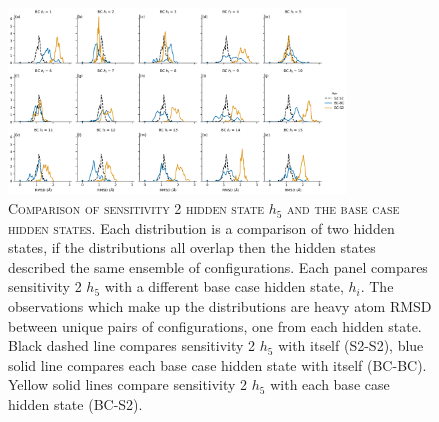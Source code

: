 \begin{figure}[h!]
 \centering
 \caption[Comparison of sensitivity 2 hidden state 5 with the base case hidden states]{\textsc{Comparison of sensitivity 2 hidden state $h_{5}$ and the base case hidden states}. Each distribution is a comparison of two hidden states, if the distributions all overlap then the hidden states described the same ensemble of configurations. Each panel compares sensitivity 2 $h_{5}$ with a different base case hidden state, $h_{i}$. The observations which make up the distributions are heavy atom RMSD between unique pairs of configurations, one from each hidden state. Black dashed line compares sensitivity 2 $h_{5}$ with itself (S2-S2), blue solid line compares each base case hidden state with itself (BC-BC). Yellow solid lines compare sensitivity 2 $h_{5}$ with each base case hidden state (BC-S2).}
 \label{fig:sens_2_overlap}
 \includegraphics[width=0.8\textwidth]{chapters/aadh/figures/sensitivity_2_5_overlap.png}
\end{figure}




